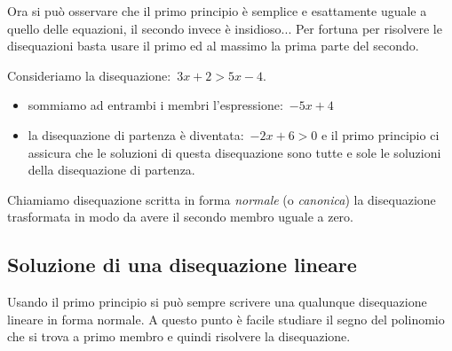 Ora si può osservare che il primo principio è semplice e esattamente uguale a 
quello delle equazioni, il secondo invece è insidioso... 
Per fortuna per risolvere le disequazioni basta usare il primo ed al massimo 
la prima parte del secondo.

 \begin{esempio}
Consideriamo la disequazione:~$3x + 2 > 5 x -4$.
\begin{itemize} [noitemsep]
 \item sommiamo ad entrambi i membri l'espressione:~$-5 x +4$ 
 \item la disequazione di partenza è diventata:~$-2 x +6 > 0$ e
  il primo principio ci assicura che le soluzioni di questa disequazione sono 
  tutte e sole le soluzioni della disequazione di partenza.
\end{itemize}
 \end{esempio}

Chiamiamo disequazione scritta in forma \emph{normale} (o \emph{canonica})
la disequazione trasformata in modo da avere il secondo membro uguale a zero.

\subsection{Soluzione di una disequazione lineare}

Usando il primo principio si può sempre scrivere una qualunque disequazione 
lineare in forma normale. A questo punto è facile studiare il segno del 
polinomio che si trova a primo membro e quindi risolvere la disequazione.

